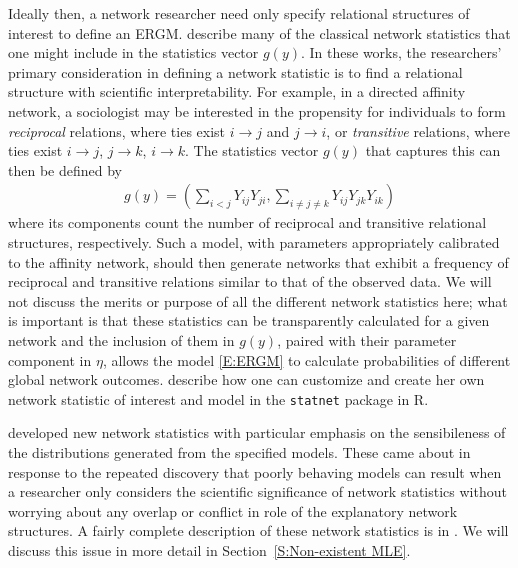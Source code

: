Ideally then, a network researcher need only specify relational structures of 
interest to define an ERGM.  
\citet*{Wasserman:1996, Pattison:1999, logit, introp*} describe many of 
the classical network statistics that one might include in the statistics vector 
$g(y)$.  In these works, the researchers' primary 
consideration in defining a network statistic is to find a relational structure 
with scientific interpretability.  
For example, in a directed affinity network, a sociologist may be 
interested in the propensity for individuals to form \emph{reciprocal} relations, where 
ties exist $i \to j$ and $j \to i$, or \emph{transitive} relations, where 
ties exist $i \to j$, $j \to k$, $i \to k$.  The statistics vector $g(y)$ 
that captures this can then be defined by
\begin{align*}
	g(y) = \left ( \sum_{i<j} Y_{ij}Y_{ji}, \sum_{i \neq j \neq k} Y_{ij}Y_{jk}Y_{ik} 
			\right )  
\end{align*}
where its components count the number of reciprocal and transitive relational 
structures, respectively.  
Such a model, with parameters appropriately calibrated to the affinity network, 
should then generate networks that exhibit a frequency of reciprocal and 
transitive relations similar to that of the observed data.
We will not discuss the merits or purpose of all the different network statistics 
here; what is important is that these statistics can be transparently calculated for a 
given network and the inclusion of them in $g(y)$, paired with their parameter 
component in $\eta$, allows the model \eqref{E:ERGM} to calculate probabilities of 
different global network outcomes.  \citet{ergm:userterms} describe how one can
customize and create her own network statistic of interest and model in the 
\texttt{statnet} package in R.


  \citet*{Handcock:2006, Hunter:2006, recentp*} developed new network statistics with 
particular emphasis on the sensibileness of the distributions generated from the specified models.  
These came about in response to the repeated discovery that poorly behaving models can
result when a researcher only considers the scientific significance of network
statistics without worrying about any overlap or conflict in role of the 
explanatory network structures.  A fairly 
complete description of these network statistics is in \citet*{Morris:2008}.  
We will discuss this issue in more detail in Section~\ref{S:Non-existent MLE}.

